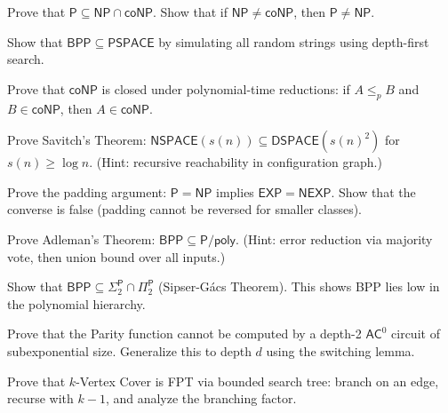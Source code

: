 \begin{exercise}[Basic]
Prove that $\mathsf{P} \subseteq \mathsf{NP} \cap \mathsf{coNP}$. Show that if $\mathsf{NP} \neq \mathsf{coNP}$, then $\mathsf{P} \neq \mathsf{NP}$.
\end{exercise}

\begin{exercise}[Basic]
Show that $\mathsf{BPP} \subseteq \mathsf{PSPACE}$ by simulating all random strings using depth-first search.
\end{exercise}

\begin{exercise}[Basic]
Prove that $\mathsf{coNP}$ is closed under polynomial-time reductions: if $A \le_p B$ and $B \in \mathsf{coNP}$, then $A \in \mathsf{coNP}$.
\end{exercise}

\begin{exercise}[Intermediate]
Prove Savitch's Theorem: $\mathsf{NSPACE}(s(n)) \subseteq \mathsf{DSPACE}(s(n)^2)$ for $s(n) \ge \log n$. (Hint: recursive reachability in configuration graph.)
\end{exercise}

\begin{exercise}[Intermediate]
Prove the padding argument: $\mathsf{P} = \mathsf{NP}$ implies $\mathsf{EXP} = \mathsf{NEXP}$. Show that the converse is false (padding cannot be reversed for smaller classes).
\end{exercise}

\begin{exercise}[Intermediate]
Prove Adleman's Theorem: $\mathsf{BPP} \subseteq \mathsf{P}/\mathsf{poly}$. (Hint: error reduction via majority vote, then union bound over all inputs.)
\end{exercise}

\begin{exercise}[Intermediate]
Show that $\mathsf{BPP} \subseteq \Sigma_2^{\mathsf{P}} \cap \Pi_2^{\mathsf{P}}$ (Sipser-G\'acs Theorem). This shows BPP lies low in the polynomial hierarchy.
\end{exercise}

\begin{exercise}[Intermediate]
Prove that the Parity function cannot be computed by a depth-2 $\mathsf{AC}^0$ circuit of subexponential size. Generalize this to depth $d$ using the switching lemma.
\end{exercise}

\begin{exercise}[Intermediate]
Prove that $k$-Vertex Cover is FPT via bounded search tree: branch on an edge, recurse with $k-1$, and analyze the branching factor.
\end{exercise}

